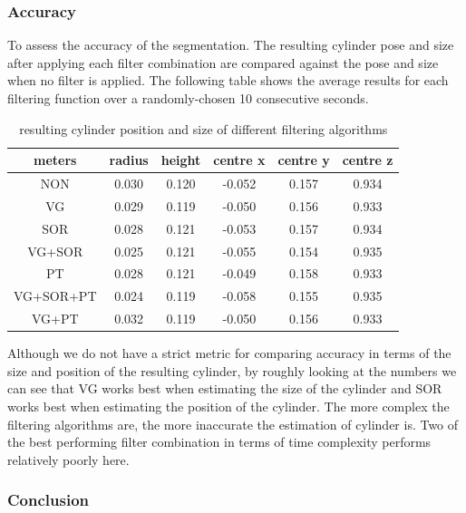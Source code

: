 \subsubsection*{Accuracy}
To assess the accuracy of the segmentation. The resulting cylinder pose and size after applying each filter combination are compared against the pose and size when no filter is applied. The following table shows the average results for each filtering function over a randomly-chosen 10 consecutive seconds.

\begin{table}[h!]
\begin{center}
 \begin{tabular}{|c c c c c c|}
 \hline 
 meters & radius &  height & centre x & centre y & centre z \\
 \hline 
 NON &  0.030 &  0.120 & -0.052 & 0.157 &  0.934 \\
 \hline 
 VG &  0.029 &  0.119 &  -0.050 & 0.156 & 0.933\\
 \hline 
 SOR &   0.028 & 0.121 & -0.053 & 0.157 & 0.934 \\
 \hline 
 VG+SOR & 0.025  & 0.121 & -0.055 &0.154 & 0.935\\
 \hline 
 PT &  0.028 & 0.121 & -0.049 & 0.158 &  0.933\\
 \hline 
 VG+SOR+PT &  0.024  &  0.119 & -0.058 & 0.155 & 0.935 \\
  \hline 
 VG+PT &   0.032 & 0.119 & -0.050 & 0.156 & 0.933 \\
 \hline
\end{tabular}
\end{center}
\caption{resulting cylinder position and size of different filtering algorithms}
\label{table:1}
\end{table}

Although we do not have a strict metric for comparing accuracy in terms of the size and position of the resulting cylinder, by roughly looking at the numbers we can see that VG works best when estimating the size of the cylinder and SOR works best when estimating the position of the cylinder. The more complex the filtering algorithms are, the more inaccurate the estimation of cylinder is. Two of the best performing filter combination in terms of time complexity performs relatively poorly here. 

\subsubsection{Conclusion}

